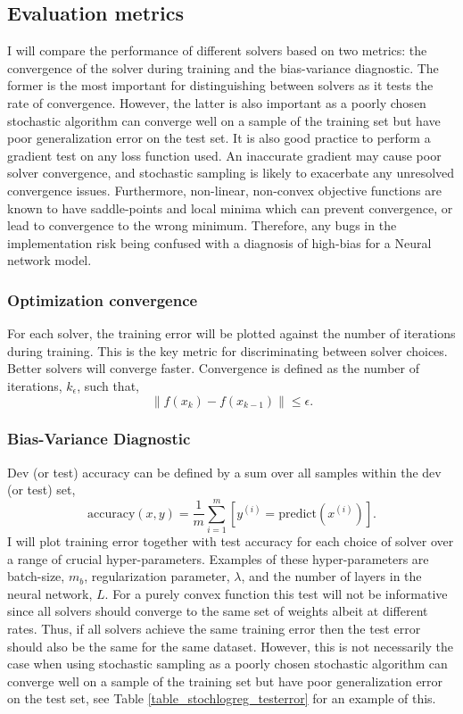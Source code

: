 \documentclass[11pt,twocolumn]{article}
\begin{document}
\subsection{Evaluation metrics}
I will compare the performance of different solvers based on two metrics: the convergence of the solver during training and the bias-variance diagnostic. The former is the most important for distinguishing between solvers as it tests the rate of convergence. However, the latter is also important as a poorly chosen stochastic algorithm can converge well on a sample of the training set but have poor generalization error on the test set.  It is also good practice to perform a gradient test on any loss function used.  An inaccurate gradient may cause poor solver convergence, and stochastic sampling is likely to exacerbate any unresolved convergence issues. Furthermore, non-linear, non-convex objective functions are known to have saddle-points and local minima which can prevent convergence, or lead to convergence to the wrong minimum. Therefore, any bugs in the implementation risk being confused with a diagnosis of high-bias for a Neural network model.

\subsubsection*{Optimization convergence}\label{metric_conv_curve}
For each solver, the training error will be plotted against the number of iterations during training. This is the key metric for discriminating between solver choices. Better solvers will converge faster. Convergence is defined as the number of iterations, $k_{\epsilon}$, such that,
\begin{equation}
\| f(x_{k})-f(x_{k-1}) \| \le \epsilon.
\end{equation}

\subsubsection*{Bias-Variance Diagnostic}\label{bias_variance}
Dev (or test) accuracy can be defined by a sum over all samples within the dev (or test) set,
\begin{equation}
\textrm{accuracy}(x,y)=\frac{1}{m}\sum_{i=1}^{m}[y^{(i)}=\textrm{predict}(x^{(i)})].
\end{equation}
I will plot training error together with test accuracy for each choice of solver over a range of crucial hyper-parameters. Examples of these hyper-parameters are batch-size, $m_b$, regularization parameter, $\lambda$, and the number of layers in the neural network, $L$. For a purely convex function this test will not be informative since all solvers should converge to the same set of weights albeit at different rates. Thus, if all solvers achieve the same training error then the test error should also be the same for the same dataset. However, this is not necessarily the case when using stochastic sampling as a poorly chosen stochastic algorithm can converge well on a sample of the training set but have poor generalization error on the test set, see Table \ref{table_stochlogreg_testerror} for an example of this.
\end{document}
